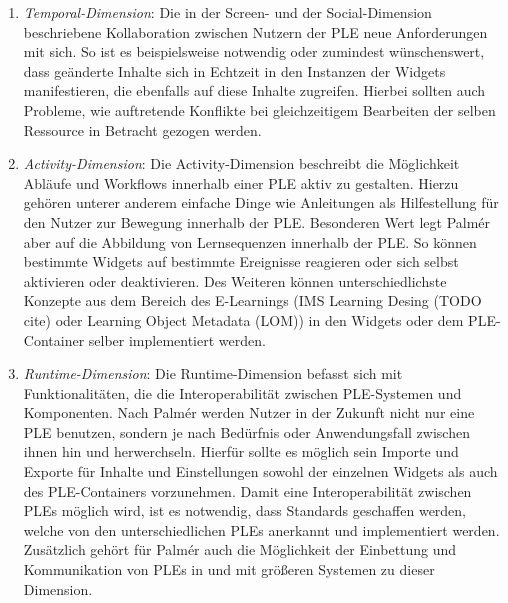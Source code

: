 \begin{enumerate}
 \item \emph{Temporal-Dimension}: Die in der Screen- und der Social-Dimension beschriebene Kollaboration zwischen Nutzern der PLE neue Anforderungen mit sich. So ist es beispielsweise notwendig oder zumindest wünschenswert, dass geänderte Inhalte sich in Echtzeit in den Instanzen der Widgets manifestieren, die ebenfalls auf diese Inhalte zugreifen. Hierbei sollten auch Probleme, wie auftretende Konflikte bei gleichzeitigem Bearbeiten der selben Ressource in Betracht gezogen werden.
 \item \emph{Activity-Dimension}: Die Activity-Dimension beschreibt die Möglichkeit Abläufe und Workflows innerhalb einer PLE aktiv zu gestalten. Hierzu gehören unterer anderem einfache Dinge wie Anleitungen als Hilfestellung für den Nutzer zur Bewegung innerhalb der PLE. Besonderen Wert legt Palmér aber auf die Abbildung von Lernsequenzen innerhalb der PLE. So können bestimmte Widgets auf bestimmte Ereignisse reagieren oder sich selbst aktivieren oder deaktivieren. Des Weiteren können unterschiedlichste Konzepte aus dem Bereich des E-Learnings (IMS Learning Desing (TODO cite) oder Learning Object Metadata (LOM)) in den Widgets oder dem PLE-Container selber implementiert werden.
 \item \emph{Runtime-Dimension}: Die Runtime-Dimension befasst sich mit Funktionalitäten, die die Interoperabilität zwischen PLE-Systemen und Komponenten. Nach Palmér werden Nutzer in der Zukunft nicht nur eine PLE benutzen, sondern je nach Bedürfnis oder Anwendungsfall zwischen ihnen hin und herwerchseln. Hierfür sollte es möglich sein Importe und Exporte für Inhalte und Einstellungen sowohl der einzelnen Widgets als auch des PLE-Containers vorzunehmen. Damit eine Interoperabilität
 zwischen PLEs möglich wird, ist es notwendig, dass Standards geschaffen werden, welche von den unterschiedlichen PLEs anerkannt und implementiert werden. Zusätzlich gehört für Palmér auch die Möglichkeit der Einbettung und Kommunikation von PLEs in und mit größeren Systemen zu dieser Dimension.
\end{enumerate}

